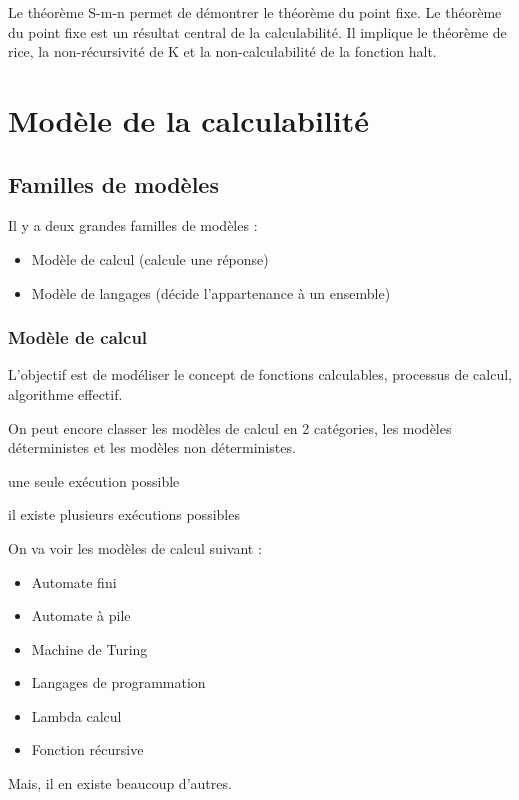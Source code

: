 Le théorème S-m-n permet de démontrer le théorème du point fixe.
Le théorème du point fixe est un résultat central de la calculabilité. Il 
implique le théorème de rice, la non-récursivité de K et la non-calculabilité 
de la fonction halt.


\section{Modèle de la calculabilité}
\label{sec:mod_le_de_la_calculabilit_}

\subsection{Familles de modèles}
\label{sub:fammilles_de_mod_les}

Il y a deux grandes familles de modèles :
\begin{itemize}
	\item Modèle de calcul (calcule une réponse)
	\item Modèle de langages (décide l'appartenance à un ensemble)
\end{itemize}

\subsubsection{Modèle de calcul}
\label{ssub:mod_le_de_calcul}
L'objectif est de modéliser le concept de fonctions calculables, processus de 
calcul, algorithme effectif.

On peut encore classer les modèles de calcul en 2 catégories, les 
modèles déterministes et les modèles non déterministes.

\begin{mydef} une seule exécution possible
\end{mydef}

\begin{mydef} il existe plusieurs exécutions 
	possibles
\end{mydef}

On va voir les modèles de calcul suivant : 
\begin{itemize}
	\item Automate fini
	\item Automate à pile
	\item Machine de Turing
	\item Langages de programmation
	\item Lambda calcul
	\item Fonction récursive
\end{itemize}
Mais, il en existe beaucoup d'autres.

